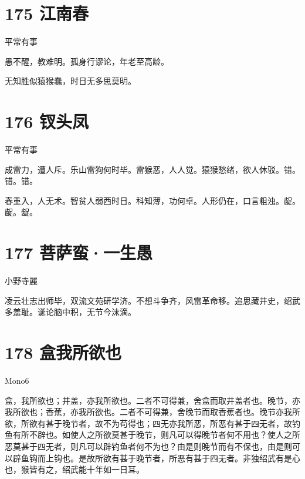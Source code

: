 \documentclass[UTF8,12pt,oneside]{ctexbook}
\begin{document}
        \section{175 江南春}
        \begin{center}
            平常有事
        \end{center}

        \begin{center}
        愚不醒，教难明。孤身行谬论，年老至高龄。
        
        无知胜似猿猴蠢，时日无多思莫明。
        \end{center}

        \section{176 钗头凤}
        \begin{center}
            平常有事
        \end{center}
        
        成雷力，遭人斥。乐山雷狗何时毕。雷猴恶，人人觉。猿猴愁绪，欲人休驳。错。错。错。    
        
        春重入，人无术。智贫人弱西时日。科知薄，功何卓。人形仍在，口言粗浊。龊。龊。龊。
        \section{177 菩萨蛮·一生愚}
        \begin{center}
            小野寺麗
        \end{center}
        
        凌云壮志出师毕，双流文苑研学济。不想斗争齐，风雷革命移。追思藏井史，绍武多羞耻。诞论脑中积，无节今沫滴。

        \section{178 盒我所欲也}
        \begin{center}
            Mono6
        \end{center}
        
        盒，我所欲也；井盖，亦我所欲也。二者不可得兼，舍盒而取井盖者也。晚节，亦我所欲也；香蕉，亦我所欲也。二者不可得兼，舍晚节而取香蕉者也。晚节亦我所欲，所欲有甚于晚节者，故不为苟得也；四无亦我所恶，所恶有甚于四无者，故钓鱼有所不辟也。如使人之所欲莫甚于晚节，则凡可以得晚节者何不用也？使人之所恶莫甚于四无者，则凡可以辟钓鱼者何不为也？由是则晚节而有不保也，由是则可以辟鱼钩而上钩也。是故所欲有甚于晚节者，所恶有甚于四无者。非独绍武有是心也，猴皆有之，绍武能十年如一日耳。
\end{document}
